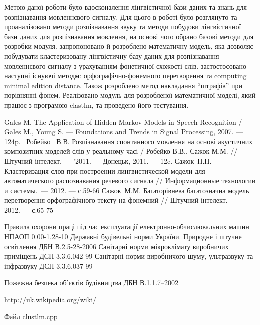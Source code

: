 \documentclass{diploma}
\begin{document}
	
	

Метою даної роботи було вдосконалення лінгвістичної бази даних та знань для розпізнавання мовленнєвого сигналу. 
Для цього в роботі було розглянуто та проаналізовано методи розпізнавання звуку та методи побудови лінгвістичної бази даних для розпізнавання мовлення, на основі чого обрано базові методи для розробки модуля. запропоновано й розроблено математичну модель, яка дозволяє побудувати кластеризовану лінгвістичну базу даних для розпізнавання мовленнєвого сигналу з урахуванням фонетичної схожості слів. застостосовано наступні існуючі методм: орфографічно-фонемного перетворення та computing minimal edition distance. Також розроблено метод накладання “штрафів” при порівнянні фонем. Реалізовано модуль для розробленої математичної моделі, який працює з програмою clastlm, та проведено його тестування.








	
	
\begin{references}
 Gales M. The Application of Hidden Markov Models in Speech Recognition / Gales M., Young S. --- Foundations and Trends in Signal Processing, 2007. --- 124p.
 ~Робейко ~В.В. Розпізнавання спонтанного мовлення на основі акустичних композитних моделей слів у реальному часі / Робейко В.В., Сажок М.М. // Штучний інтелект. --- '2011. --- Донецьк, 2011. --- 12c.
 Сажок~Н.Н. Кластеризация слов при построении лингвистической модели для автоматического распознавания речевого сигнала // Информационные технологии и системы.~--- 2012. --- с.59-66
 Сажок~М.М. Багаторівнева багатозначна модель перетворення орфографічного тексту на  фонемний // Штучний інтелект.~--- 2012. --- с.65-75


 Правила охорони праці під час експлуатації електронно-обчислювальних машин НПАОП 0.00-1.28-10     
 Державні будівельні норми України. Природне і штучне освітлення ДБН В.2.5-28-2006 
 Санітарні норми мікроклімату виробничих приміщень ДСН 3.3.6.042-99
 Санітарні норми виробничого шуму, ультразвуку та інфразвуку ДСН 3.3.6.037-99

 Пожежна безпека об’єктів будівництва ДБН В.1.1.7–2002 

 \url{http://uk.wikipedia.org/wiki/}


\end{references}	
	
	
\newpage
{}

	
\lstset{language=C++,basicstyle=\ttfamily\scriptsize}
	Файл clustlm.cpp
	
\end{document}
